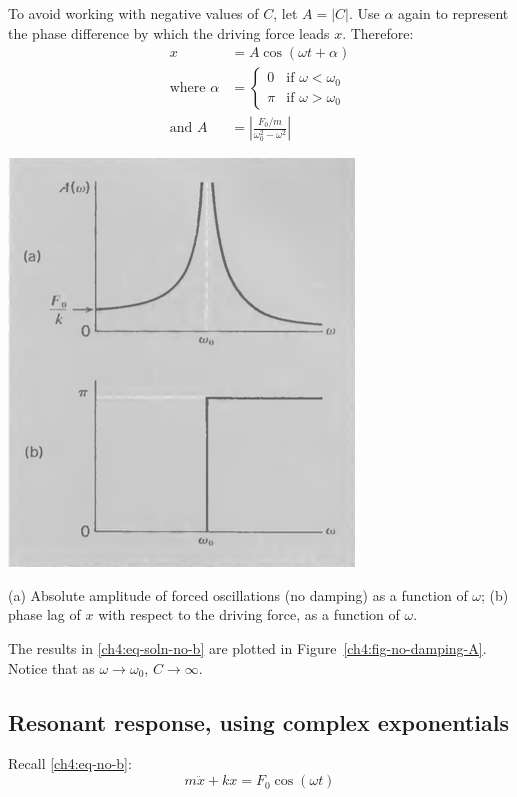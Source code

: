 To avoid working with negative values of $C$, let $A=|C|$. Use $\alpha$ again to represent the phase difference by which the driving force leads $x$. Therefore:
\begin{equation}
\boxed{
	\begin{split}
		x &= A \cos(\omega t + \alpha)  \\
		\text{where }
		\alpha &= 
		\begin{cases}
			0 & \text{if } \omega<\omega_0 \\
			\pi & \text{if } \omega>\omega_0
		\end{cases}
		\\
		\text{and }
		A &= \left| \frac{F_0/m}{\omega_0^2-\omega^2}  \right| 
	\end{split}
}
\label{ch4:eq-soln-no-b}
\end{equation}


\begin{marginfigure}
	\centering
	\includegraphics[scale=0.5]{phys232/Ch4-forced-no-damping-A.png} \caption{(a) Absolute amplitude of forced oscillations (no damping) as a function of $\omega$; (b) phase lag of $x$ with respect to the driving force, as a function of $\omega$.}	\label{ch4:fig-no-damping-A}
\end{marginfigure}

The results in \eqref{ch4:eq-soln-no-b} are plotted in Figure~\ref{ch4:fig-no-damping-A}. Notice that as $\omega\to\omega_0$, $C\to \infty$.


\subsection{Resonant response, using complex exponentials}
Recall \eqref{ch4:eq-no-b}:
\[ m\ddot{x} + kx = F_0 \cos(\omega t) \]

